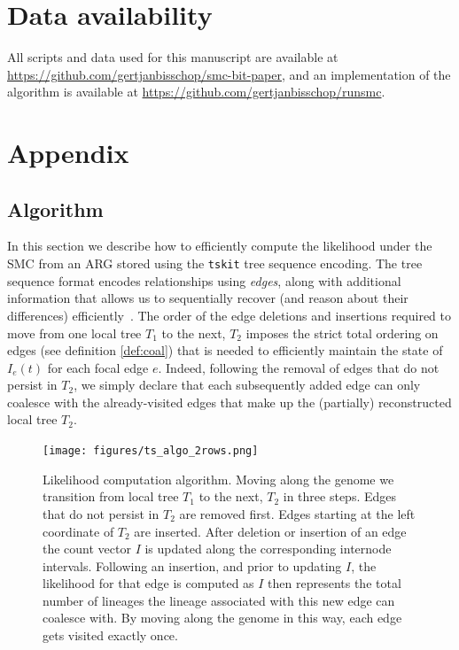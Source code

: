 \documentclass{article}
\begin{document}
\section{Data availability}

All scripts and data used for this manuscript are available at
\url{https://github.com/gertjanbisschop/smc-bit-paper},
and an implementation of the algorithm is available at
\url{https://github.com/gertjanbisschop/runsmc}.
\FloatBarrier



\setcounter{secnumdepth}{2} %

\section*{Appendix}
\appendix

\setcounter{table}{0}
\setcounter{figure}{0}
\renewcommand{\thetable}{A\arabic{table}}
\renewcommand{\thefigure}{A\arabic{figure}}

\subsection*{Algorithm} \label{par:algo}
In this section we describe how to efficiently compute the likelihood under the SMC
from an ARG stored using the \texttt{tskit} tree sequence encoding. 
The tree sequence format encodes relationships using \emph{edges},
along with additional information that
allows us to sequentially recover (and reason about 
their differences) 
efficiently~\citep{kelleher_efficient_2016, ralph_efficiently_2020}.
The order of the edge deletions and insertions required to move from one local tree $T_1$ to
the next, $T_2$ imposes the strict total ordering on edges
(see definition \eqref{def:coal})
that is needed to efficiently maintain the state of $I_e(t)$ for each focal edge $e$.
Indeed, following the removal of edges that do not persist in $T_2$,
we simply declare that each subsequently added edge
can only coalesce with the already-visited edges 
that make up the (partially) reconstructed local tree $T_2$.

\begin{figure}[!ht]
\centering
\texttt{[image: figures/ts\_algo\_2rows.png]}
\caption{Likelihood computation algorithm. 
Moving along the genome we transition from
local tree $T_1$ to the next, $T_2$ in three steps. 
Edges that do not persist in $T_2$ are
removed first. Edges starting at the left coordinate of $T_2$ are inserted.
After deletion or insertion of an edge the count vector $I$ is updated along the
corresponding internode intervals. Following an insertion, and prior to updating $I$,
the likelihood for that edge is computed as $I$ then represents the total number of
lineages the lineage associated with this new edge can
coalesce with. By moving along the genome in this way, each edge gets visited exactly once.}
\label{fig:algo}
\end{figure}
\end{document}
